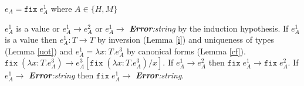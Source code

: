 \begin{case}
$e_{A}=\mathtt{fix}\;e_{A}^{1}$ where $A\in\lbrace H,M\rbrace$

$e_{A}^{1}$ is a value or $e_{A}^{1}\rightarrow e_{A}^{2}$ or $e_{A}^{1}\rightarrow$ \emph{\textbf{Error}:\;string} by the induction hypothesis.  If $e_{A}^{1}$ is a value then $e_{A}^{1}:T\rightarrow T$ by inversion (Lemma \ref{i}) and uniqueness of types (Lemma \ref{uot}) and $e_{A}^{1}=\lambda x:T.e_{A}^{3}$ by canonical forms (Lemma \ref{cf}).  $\mathtt{fix}\;(\lambda x:T.e_{A}^{3})\rightarrow e_{A}^{3}[\mathtt{fix}\;(\lambda x:T.e_{A}^{3})/x]$.  If $e_{A}^{1}\rightarrow e_{A}^{2}$ then $\mathtt{fix}\;e_{A}^{1}\rightarrow\mathtt{fix}\;e_{A}^{2}$.  If $e_{A}^{1}\rightarrow$ \emph{\textbf{Error}:\;string} then $\mathtt{fix}\;e_{A}^{1}\rightarrow$ \emph{\textbf{Error}:\;string}.
\end{case}